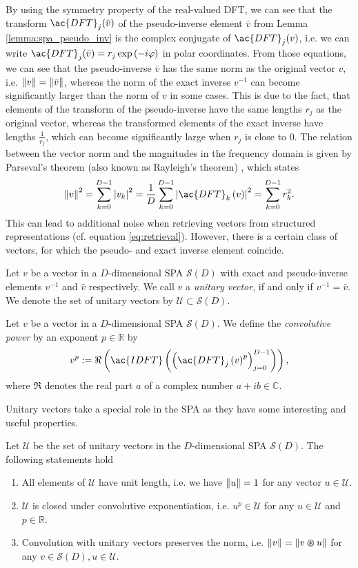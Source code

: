 By using the symmetry property of the real-valued \ac{DFT}, we can see that the transform $\ac{DFT}_j(\bar{v})$ of the pseudo-inverse element $\bar{v}$ from Lemma \ref{lemma:spa_pseudo_inv} is the complex conjugate of $\ac{DFT}_j(v)$, i.e. we can write $\ac{DFT}_j(\bar{v}) = r_j \exp\left(-i\varphi\right)$ in polar coordinates.
From those equations, we can see that the pseudo-inverse $\bar{v}$ has the same norm as the original vector $v$, i.e. $\left\| v \right\| = \left\| \bar{v} \right\|$, whereas the norm of the exact inverse $v^{-1}$ can become significantly larger than the norm of $v$ in some cases.
This is due to the fact, that elements of the transform of the pseudo-inverse have the same lengths $r_j$ as the original vector, whereas the transformed elements of the exact inverse have lengths $\frac{1}{r_j}$, which can become significantly large when $r_j$ is close to $0$.
The relation between the vector norm and the magnitudes in the frequency domain is given by Parseval's theorem (also known as Rayleigh's theorem) \cite[Chap. 6]{Bracewell2000}, which states
\[
\norm{v}^2 = \sum_{k=0}^{D-1} \left| v_{k} \right|^{2} = \frac{1}{D} \sum_{k=0}^{D-1} \left|\ac{DFT}_{k}\left(v\right)\right|^{2} = \sum_{k=0}^{D-1} r_{k}^{2}.
\]
This can lead to additional noise when retrieving vectors from structured representations (cf. equation \ref{eq:retrieval}).
However, there is a certain class of vectors, for which the pseudo- and exact inverse element coincide.
\begin{defn}
	\label{def:unitary_vec}
	Let $v$ be a vector in a $D$-dimensional \ac{SPA} $\mathcal{S}(D)$ with exact and pseudo-inverse elements $v^{-1}$ and $\bar{v}$ respectively.
	We call $v$ a \emph{unitary vector}, if and only if $v^{-1} = \bar{v}$.
	We denote the set of unitary vectors by $\mathcal{U} \subset \mathcal{S}(D)$.
\end{defn}
\begin{defn}
	\label{def:conv_power}
	Let $v$ be a vector in a $D$-dimensional \ac{SPA} $\mathcal{S}(D)$. We define the \emph{convolutive power} by an exponent $p \in \mathbb{R}$ by
	\[
	v^{p} := \Re\left(\ac{IDFT} \left(\left(\ac{DFT}_{j}\left(v\right)^{p}\right)_{j=0}^{D-1}\right)\right),
	\]
	where $\Re$ denotes the real part $a$ of a complex number $a + ib \in \mathbb{C}$.
\end{defn}
Unitary vectors take a special role in the \ac{SPA} as they have some interesting and useful properties.
\begin{lemma}
	\label{lemma:unitary_vec}
	Let $\mathcal{U}$ be the set of unitary vectors in the $D$-dimensional \ac{SPA} $\mathcal{S}(D)$. The following statements hold
 	\begin{enumerate}[label=\roman*]
		\item All elements of $\mathcal{U}$ have unit length, i.e. we have $\left\| u \right\| = 1$ for any vector $u \in \mathcal{U}$.
		\item $\mathcal{U}$ is closed under convolutive exponentiation, i.e. $u^{p} \in \mathcal{U}$ for any $u \in \mathcal{U}$ and $p \in \mathbb{R}$.
		\item Convolution with unitary vectors preserves the norm, i.e. $\left\| v \right\| = \left\| v \varoast u \right\|$ for any $v \in \mathcal{S}(D), u \in \mathcal{U}$.
	\end{enumerate}
\end{lemma}
